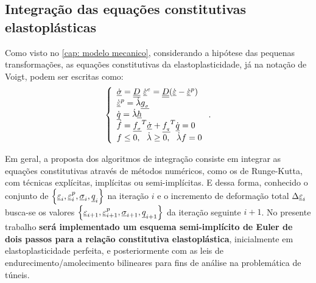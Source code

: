 \subsection{Integração das equações constitutivas elastoplásticas}

Como visto no \autoref{cap: modelo mecanico}, considerando a hipótese das pequenas transformações, as equações constitutivas da elastoplasticidade, já na notação de Voigt, podem ser escritas como:
\begin{equation}
	\label{eq:constitutiva_ep}
	\left\{
	\begin{array}{lcl}
		\dot {\underline \sigma} = \underline{\underline D}~\dot {\underline{\varepsilon}}^e = \underline{\underline D}(\dot {\underline{\varepsilon}} - \dot {\underline{\varepsilon}}^p) \\
		\dot {\underline{\varepsilon}}^p = \dot \lambda \underline{g_{_\sigma}} \\
		\dot {\underline q} = \dot \lambda \underline h \\
		\dot f = \underline{f_{_\sigma}}^T \dot {\underline \sigma} + \underline{f_{_q}}^T \dot {\underline q} = 0 \\
		f \leq 0,~~\dot \lambda \geq 0,~~\dot \lambda f = 0	
	\end{array}
	\right..
\end{equation}

Em geral, a proposta dos algoritmos de integração consiste em integrar as equações constitutivas através de métodos numéricos, como os de Runge-Kutta, com técnicas explícitas, implícitas ou semi-implícitas. E dessa forma, conhecido o conjunto de $\left\{ \underline{\varepsilon}_i, \underline{\varepsilon}_i^p,\underline \sigma_i,\underline q_i \right\}$   na iteração $i$ e o incremento de deformação total $\Delta \underline{\varepsilon}_i$ busca-se os valores $\left\{ \underline{\varepsilon}_{i+1}, \underline{\varepsilon}_{i+1}^p,\underline \sigma_{i+1},\underline q_{i+1} \right\}$ da iteração seguinte $i+1$. No presente trabalho \textbf{será implementado um esquema semi-implícito de Euler de dois passos para a relação constitutiva elastoplástica}, inicialmente em elastoplasticidade perfeita, e posteriormente com as leis de endurecimento/amolecimento bilineares para fins de análise na problemática de túneis.

